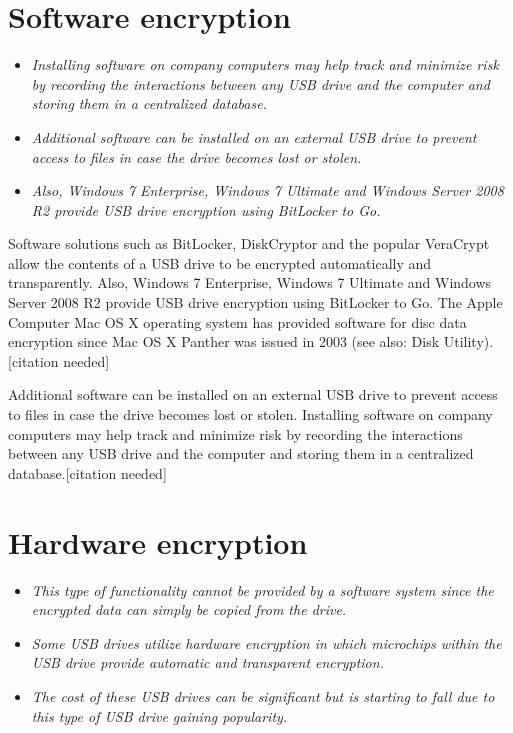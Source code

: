 \section{Software encryption}\label{software-encryption}

\begin{itemize}
\item
  \emph{Installing software on company computers may help track and
  minimize risk by recording the interactions between any USB drive and
  the computer and storing them in a centralized database.}
\item
  \emph{Additional software can be installed on an external USB drive to
  prevent access to files in case the drive becomes lost or stolen.}
\item
  \emph{Also, Windows 7 Enterprise, Windows 7 Ultimate and Windows
  Server 2008 R2 provide USB drive encryption using BitLocker to Go.}
\end{itemize}

Software solutions such as BitLocker, DiskCryptor and the popular
VeraCrypt allow the contents of a USB drive to be encrypted
automatically and transparently. Also, Windows 7 Enterprise, Windows 7
Ultimate and Windows Server 2008 R2 provide USB drive encryption using
BitLocker to Go. The Apple Computer Mac OS X operating system has
provided software for disc data encryption since Mac OS X Panther was
issued in 2003 (see also: Disk Utility).{[}citation needed{]}

Additional software can be installed on an external USB drive to prevent
access to files in case the drive becomes lost or stolen. Installing
software on company computers may help track and minimize risk by
recording the interactions between any USB drive and the computer and
storing them in a centralized database.{[}citation needed{]}

\section{Hardware encryption}\label{hardware-encryption}

\begin{itemize}
\item
  \emph{This type of functionality cannot be provided by a software
  system since the encrypted data can simply be copied from the drive.}
\item
  \emph{Some USB drives utilize hardware encryption in which microchips
  within the USB drive provide automatic and transparent encryption.}
\item
  \emph{The cost of these USB drives can be significant but is starting
  to fall due to this type of USB drive gaining popularity.}
\end{itemize}

